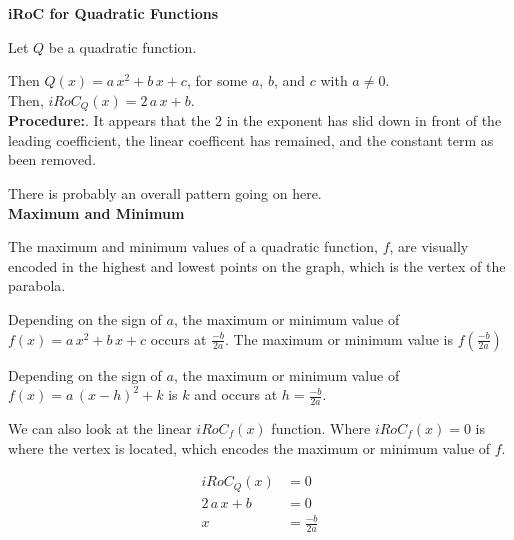 \documentclass{ximera}
\begin{document}
\begin{procedure} \textbf{\textcolor{blue!75!black}{iRoC for Quadratic Functions}} 



Let $Q$ be a quadratic function.

Then $Q(x) = a \, x^2 + b \, x + c$, for some $a$, $b$, and $c$ with $a \ne 0$. \\

Then, $iRoC_Q(x) = 2 \, a \, x + b$. \\


\textbf{Procedure:}. It appears that the $2$ in the exponent has slid down in front of the leading coefficient, the linear coefficent has remained, and the constant term as been removed. 



\end{procedure}

There is probably an overall pattern going on here. \\










\textbf{\textcolor{blue!55!black}{Maximum and Minimum}}



The maximum and minimum values of a quadratic function, $f$, are visually encoded in the highest and lowest points on the  graph, which is the vertex of the parabola.

Depending on the sign of $a$, the maximum or minimum value of $f(x) = a \, x^2 + b \, x + c$ occurs at $\frac{-b}{2a}$. The maximum or minimum value is $f\left( \frac{-b}{2a} \right)$


Depending on the sign of $a$, the maximum or minimum value of $f(x) = a \, (x - h)^2 + k$ is $k$ and occurs at $h = \frac{-b}{2a}$. 







We can also look at the linear $iRoC_f(x)$ function.  Where $iRoC_f(x) = 0$ is where the vertex is located, which encodes the maximum or minimum value of $f$.





\begin{align*}
iRoC_Q(x)       &= 0  \\
2 \, a \, x + b  & = 0  \\
x     &=  \frac{-b}{2a}
\end{align*}
\end{document}
